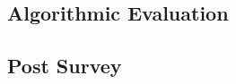 

\subsection{Algorithmic Evaluation}
\label{sec:algor-eval}


\subsection{Post Survey}
\label{sec:post-survey}


